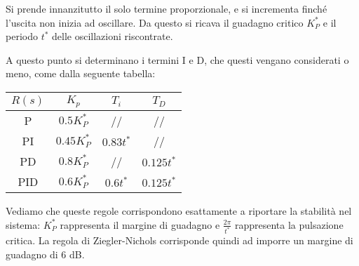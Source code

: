 \documentclass[a4paper,11pt]{article}
\begin{document}
Si prende innanzitutto il solo termine proporzionale, e si incrementa finché l'uscita non inizia ad oscillare.
		Da questo si ricava il guadagno critico $K_P^*$ e il periodo $t^*$ delle oscillazioni riscontrate.

A questo punto si determinano i termini I e D, che questi vengano considerati o meno, come dalla seguente tabella:

\begin{table}[h!]
	\center {}
	\begin{tabular} { c || c | c | c }
		$R(s)$ & $K_p$ & $T_i$ & $T_D$ \\
		\hline
		P & $0.5 K_P^*$ & // & // \\
		PI & $0.45 K_P^*$ & $0.83 t^*$ & // \\
		PD & $0.8 K_P^*$ & // & $0.125 t^*$ \\
		PID & $0.6 K_P^*$ & $0.6 t^*$ & $0.125 t^*$ \\
	\end{tabular}
\end{table}

Vediamo che queste regole corrispondono esattamente a riportare la stabilità nel sistema: $K_P^*$ rappresenta il margine di guadagno e $\frac{2 \pi}{t^*}$ rappresenta la pulsazione critica.
La regola di Ziegler-Nichols corrisponde quindi ad imporre un margine di guadagno di 6 dB.
\end{document}

